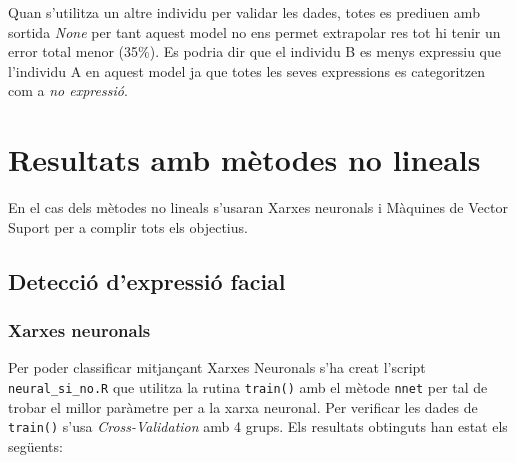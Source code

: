 \documentclass[a4paper]{article}
\begin{document}
Quan s'utilitza un altre individu per validar les dades, totes es prediuen amb sortida \emph{None} per tant aquest model no ens permet extrapolar res tot hi tenir un error total menor (35\%). Es podria dir que el individu B es menys expressiu que l’individu A en aquest model ja que totes les seves expressions es categoritzen com a \emph{no expressió}.

\section{Resultats amb mètodes no lineals}
En el cas dels mètodes no lineals s'usaran Xarxes neuronals i Màquines de Vector Suport per a complir tots els objectius.

\subsection{Detecció d'expressió facial}
\subsubsection{Xarxes neuronals}

Per poder classificar mitjançant Xarxes Neuronals s'ha creat l'script \verb|neural_si_no.R| que utilitza la rutina \verb|train()| amb el mètode \verb|nnet| per tal de trobar el millor paràmetre per a la xarxa neuronal. Per verificar les dades de \verb|train()| s'usa \emph{Cross-Validation} amb 4 grups. Els resultats obtinguts han estat els següents:
\end{document}
